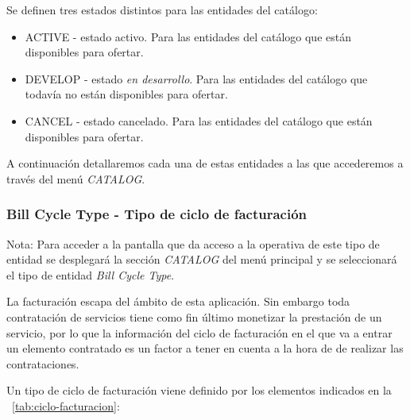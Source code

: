 Se definen tres estados distintos para las entidades del catálogo:
\begin{itemize}
\item ACTIVE - estado activo. Para las entidades del catálogo que están disponibles para ofertar.
\item DEVELOP - estado \textit{en desarrollo}. Para las entidades del catálogo que todavía no están disponibles para ofertar.
\item CANCEL - estado cancelado. Para las entidades del catálogo que están disponibles para ofertar.
\end{itemize}



A continuación detallaremos cada una de estas entidades a las que accederemos a través del menú \emph{CATALOG}.

\subsubsection{Bill Cycle Type - Tipo de ciclo de facturación}
\label{sub:billcycle}

Nota: Para acceder a la pantalla que da acceso a la operativa de este tipo de entidad se desplegará la sección \emph{CATALOG} del menú principal y se seleccionará el tipo de entidad \emph{Bill Cycle Type}.

La facturación escapa del ámbito de esta aplicación. Sin embargo toda contratación de servicios tiene como fin último monetizar la prestación de un servicio, por lo que la información del ciclo de facturación en el que va a entrar un elemento contratado es un factor a tener en cuenta a la hora de de realizar las contrataciones.

Un tipo de ciclo de facturación viene definido por los elementos indicados en la \tablename~\ref{tab:ciclo-facturacion}:



